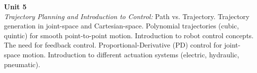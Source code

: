 \vspace{0.3cm}

\noindent\textbf{Unit 5} \\
\textit{Trajectory Planning and Introduction to Control:} Path vs. Trajectory. Trajectory generation in joint-space and Cartesian-space. Polynomial trajectories (cubic, quintic) for smooth point-to-point motion. Introduction to robot control concepts. The need for feedback control. Proportional-Derivative (PD) control for joint-space motion. Introduction to different actuation systems (electric, hydraulic, pneumatic).

\newpage
{}